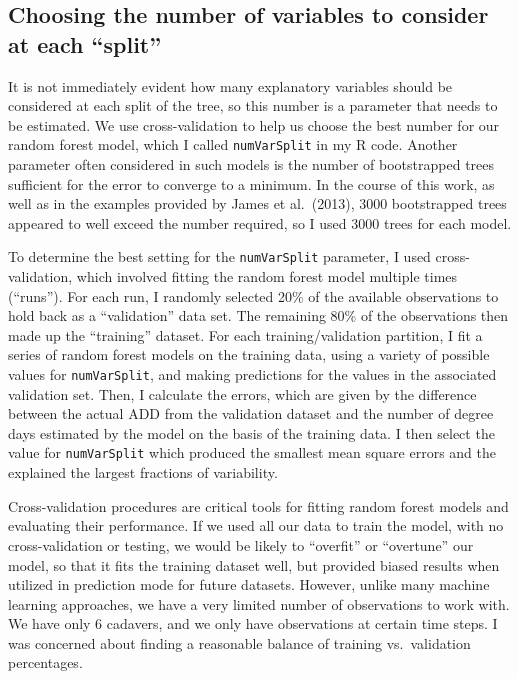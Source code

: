 \documentclass{article}
\begin{document}
\subsection{Choosing the number of variables to consider at each ``split''}

It is not immediately evident how many explanatory variables should be
considered at each split of the tree, so this number is a parameter
that needs to be estimated.  We use cross-validation to help us choose
the best number for our random forest model, which I called
\texttt{numVarSplit} in my R code.  Another parameter often considered
in such models is the number of bootstrapped trees sufficient for the
error to converge to a minimum.  In the course of this work, as well
as in the examples provided by James et al.\ (2013), 3000 bootstrapped
trees appeared to well exceed the number required, so I used 3000
trees for each model.

To determine the best setting for the \texttt{numVarSplit} parameter,
I used cross-validation, which involved fitting the random forest
model multiple times (``runs'').  For each run, I randomly selected
20\% of the available observations to hold back as a ``validation''
data set.  The remaining 80\% of the observations then made up the
``training'' dataset.  For each training/validation partition, I fit a
series of random forest models on the training data, using a variety
of possible values for \texttt{numVarSplit}, and making predictions
for the values in the associated validation set.  Then, I calculate
the errors, which are given by the difference between the actual ADD
from the validation dataset and the number of degree days estimated by
the model on the basis of the training data.  I then select the value
for \texttt{numVarSplit} which produced the smallest mean square
errors and the explained the largest fractions of variability.

Cross-validation procedures are critical tools for fitting random
forest models and evaluating their performance.  If we used all our
data to train the model, with no cross-validation or testing, we would
be likely to ``overfit'' or ``overtune'' our model, so that it fits
the training dataset well, but provided biased results when utilized
in prediction mode for future datasets.  However, unlike many machine
learning approaches, we have a very limited number of observations to
work with.  We have only 6 cadavers, and we only have observations at
certain time steps.  I was concerned about finding a reasonable
balance of training vs.~validation percentages.
\end{document}
